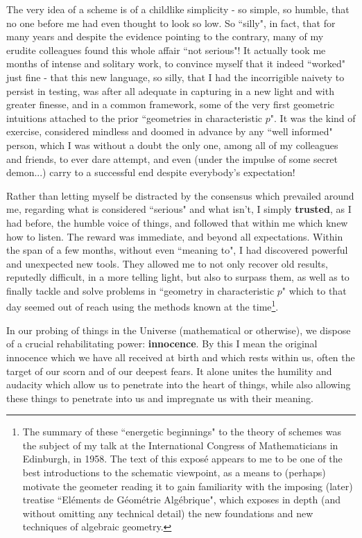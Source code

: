 The very idea of a scheme is of a childlike simplicity - so simple, so humble, that no one before me had even thought to look so low. So ``silly", in fact, that for many years and despite the evidence pointing to the contrary, many of my erudite colleagues found this whole affair ``not serious"! It actually took me months of intense and solitary work, to convince myself that it indeed ``worked" just fine - that this new language, so silly, that I had the incorrigible naivety to persist in testing, was after all adequate in capturing in a new light and with greater finesse, and in a common framework, some of the very first geometric intuitions attached to the prior ``geometries in characteristic $p$". It was the kind of exercise, considered mindless and doomed in advance by any ``well informed" person, which I was without a doubt the only one, among all of my colleagues and friends, to ever dare attempt, and even (under the impulse of some secret demon...) carry to a successful end despite everybody's expectation!

Rather than letting myself be distracted by the consensus which prevailed around me, regarding what is considered ``serious" and what isn't, I simply \textbf{trusted}, as I had before, the humble voice of things, and followed that within me which knew how to listen. The reward was immediate, and beyond all expectations. Within the span of a few months, without even ``meaning to", I had discovered powerful and unexpected new tools. They allowed me to not only recover old results, reputedly difficult, in a more telling light, but also to surpass them, as well as to finally tackle and solve problems in ``geometry in characteristic $p$" which to that day seemed out of reach using the methods known at the time\footnote{The summary of these ``energetic beginnings" to the theory of schemes was the subject of my talk at the International Congress of Mathematicians in Edinburgh, in 1958. The text of this expos\'e appears to me to be one of the best introductions to the schematic viewpoint, as a means to (perhaps) motivate the geometer reading it to gain familiarity with the imposing (later) treatise ``El\'ements de G\'eom\'etrie Alg\'ebrique", which exposes in depth (and without omitting any technical detail) the new foundations and new techniques of algebraic geometry.}.

In our probing of things in the Universe (mathematical or otherwise), we dispose of a crucial rehabilitating power: \textbf{innocence}. By this I mean the original innocence which we have all received at birth and which rests within us, often the target of our scorn and of our deepest fears. It alone unites the humility and audacity which allow us to penetrate into the heart of things, while also allowing these things to penetrate into us and impregnate us with their meaning.

